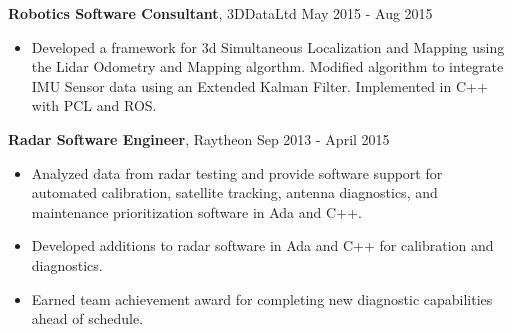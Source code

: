 \documentclass{article} %
\newcommand{\rjob}[2]{
  \hspace*{-0.3cm}
{\fontsize{10pt}{12pt}\selectfont #1} \hfill #2
\vspace*{0.1cm}
\hspace*{-1.2cm}
}
\newenvironment{ritemize}{
\hspace*{-0.8cm}
\begin{minipage}{1.05\linewidth}
\begin{itemize}
}{
\end{itemize}
\end{minipage}
}
\newcommand{\ritem}{
\item[-]
}
\begin{document}
\rjob{\textbf{Robotics Software Consultant}, 3DDataLtd}{May 2015 - Aug 2015}\\
\begin{ritemize}
\ritem Developed a framework for 3d Simultaneous Localization and Mapping using the Lidar Odometry and Mapping algorthm. Modified algorithm to integrate IMU Sensor data using an Extended Kalman Filter. Implemented in C++ with PCL and ROS.
\end{ritemize}

\rjob{\textbf{Radar Software Engineer}, Raytheon}{Sep 2013 - April 2015}\\
\begin{ritemize}
\ritem Analyzed data from radar testing and provide software support for automated calibration, satellite tracking, antenna diagnostics, and maintenance prioritization software in Ada and C++.
\ritem Developed additions to radar software in Ada and C++ for calibration and diagnostics.
\ritem Earned team achievement award for completing new diagnostic capabilities ahead of schedule.
\end{ritemize}








\end{document}

